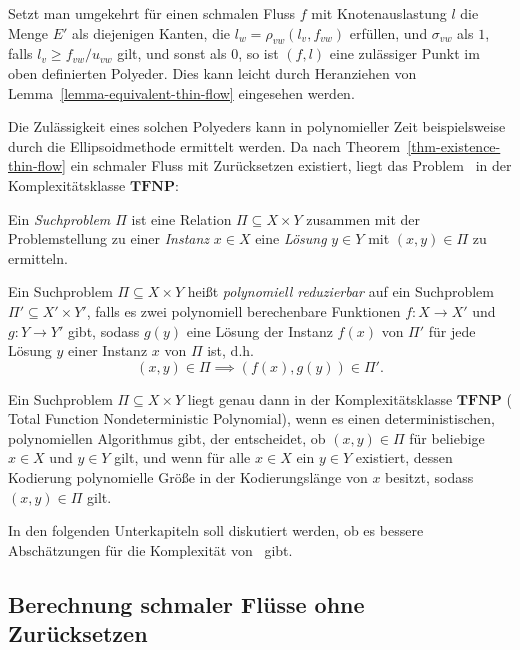 Setzt man umgekehrt für einen schmalen Fluss $f$ mit Knotenauslastung $l$ die Menge $E'$ als diejenigen Kanten, die $l_w = \rho_{vw}(l_v, f_{vw})$ erfüllen, und $\sigma_{vw}$ als $1$, falls $l_v \geq f_{vw}/u_{vw}$ gilt, und sonst als $0$, so ist $(f, l)$ eine zulässiger Punkt im oben definierten Polyeder.
Dies kann leicht durch Heranziehen von Lemma~\ref{lemma-equivalent-thin-flow} eingesehen werden.

\newcommand{\TFNP}{\mathbf{TFNP}}

Die Zulässigkeit eines solchen Polyeders kann in polynomieller Zeit beispielsweise durch die Ellipsoidmethode ermittelt werden.
Da nach Theorem~\ref{thm-existence-thin-flow} ein schmaler Fluss mit Zurücksetzen existiert, liegt das Problem \probTFwR\ in der Komplexitätsklasse $\TFNP$:

\begin{definition}[Suchproblem]
	Ein \emph{Suchproblem $\Pi$} ist eine Relation $\Pi\subseteq X \times Y$ zusammen mit der Problemstellung zu einer \emph{Instanz} $x\in X$ eine \emph{Lösung} $y\in Y$ mit $(x,y)\in \Pi$ zu ermitteln.
	
	Ein Suchproblem $\Pi\subseteq X\times Y$ heißt \emph{polynomiell reduzierbar} auf ein Suchproblem $\Pi'\subseteq X'\times Y'$, falls es zwei polynomiell berechenbare Funktionen $f: X\rightarrow X'$ und $g: Y\rightarrow Y'$ gibt, sodass $g(y)$ eine Lösung der Instanz $f(x)$ von $\Pi'$ für jede Lösung $y$ einer Instanz $x$ von $\Pi$ ist, d.h.
	\[ (x,y) \in \Pi \implies (f(x), g(y)) \in \Pi'.\]
\end{definition}
\begin{definition}[Komplexitätsklasse $\TFNP$]
	Ein Suchproblem $\Pi\subseteq X \times Y$ liegt genau dann in der Komplexitätsklasse $\TFNP$ (	Total Function Nondeterministic Polynomial), wenn es einen deterministischen, polynomiellen Algorithmus gibt, der entscheidet, ob $(x,y) \in \Pi$ für beliebige $x\in X$ und $y\in Y$ gilt, und wenn für alle $x\in X$ ein $y\in Y$ existiert, dessen Kodierung polynomielle Größe in der Kodierungslänge von $x$ besitzt, sodass $(x, y) \in \Pi$ gilt.
\end{definition}

In den folgenden Unterkapiteln soll diskutiert werden, ob es bessere Abschätzungen für die Komplexität von \probTFwR\ gibt.

\subsection{Berechnung schmaler Flüsse ohne Zurücksetzen}


